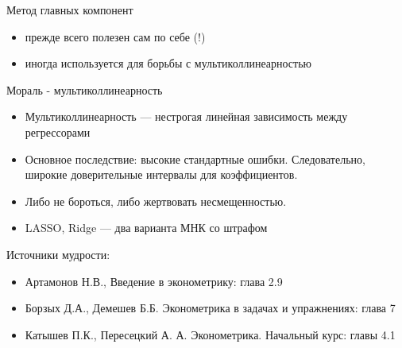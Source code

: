 \documentclass[russian,ignorenonframetext,]{beamer}
\providecommand{\tightlist}{%
  \setlength{\itemsep}{0pt}\setlength{\parskip}{0pt}}
\begin{document}
\begin{frame}{Метод главных компонент}

\begin{itemize}
\tightlist
\item
  прежде всего полезен сам по себе (!)
\item
  иногда используется для борьбы с мультиколлинеарностью
\end{itemize}

\end{frame}

\begin{frame}{Мораль - мультиколлинеарность}

\begin{itemize}
\item
  Мультиколлинеарность --- нестрогая линейная зависимость между
  регрессорами
\item
  Основное последствие: высокие стандартные ошибки. Следовательно,
  широкие доверительные интервалы для коэффициентов.
\item
  Либо не бороться, либо жертвовать несмещенностью.
\item
  LASSO, Ridge --- два варианта МНК со штрафом
\end{itemize}

\end{frame}

\begin{frame}{Источники мудрости:}

\begin{itemize}
\item
  Артамонов Н.В., Введение в эконометрику: глава 2.9
\item
  Борзых Д.А., Демешев Б.Б. Эконометрика в задачах и упражнениях: глава
  7
\item
  Катышев П.К., Пересецкий А. А. Эконометрика. Начальный курс: главы 4.1
\end{itemize}

\end{frame}
\end{document}
